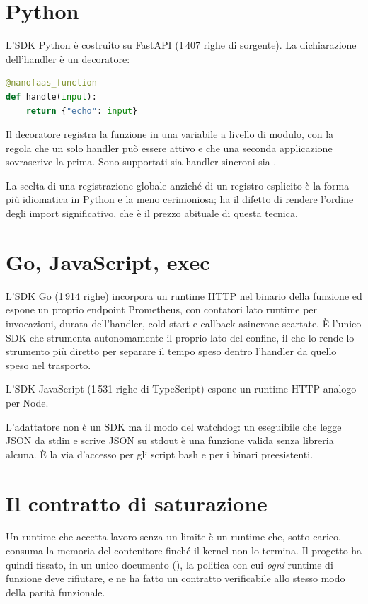 \section{Python}

L'SDK Python \`e costruito su FastAPI (1\,407 righe di sorgente). La
dichiarazione dell'handler \`e un decoratore:

\begin{lstlisting}[language=Python]
@nanofaas_function
def handle(input):
    return {"echo": input}
\end{lstlisting}

Il decoratore registra la funzione in una variabile a livello di modulo, con la
regola che un solo handler pu\`o essere attivo e che una seconda applicazione
sovrascrive la prima. Sono supportati sia handler sincroni sia .

La scelta di una registrazione globale anzich\'e di un registro esplicito \`e la
forma pi\`u idiomatica in Python e la meno cerimoniosa; ha il difetto di rendere
l'ordine degli import significativo, che \`e il prezzo abituale di questa
tecnica.

\section{Go, JavaScript, exec}

L'SDK Go (1\,914 righe) incorpora un runtime HTTP nel binario della
funzione ed espone un proprio endpoint  Prometheus, con contatori
lato runtime per invocazioni, durata dell'handler, cold start e callback
asincrone scartate. \`E l'unico SDK che strumenta autonomamente il proprio lato
del confine, il che lo rende lo strumento pi\`u diretto per separare il tempo
speso dentro l'handler da quello speso nel trasporto.

L'SDK JavaScript (1\,531 righe di TypeScript) espone un runtime HTTP analogo per Node.

L'adattatore  non \`e un SDK ma il modo  del watchdog: un
eseguibile che legge JSON da stdin e scrive JSON su stdout \`e una funzione
valida senza libreria alcuna. \`E la via d'accesso per gli script bash e per i
binari preesistenti.

\section{Il contratto di saturazione}
\label{sec:18-saturazione}

Un runtime che accetta lavoro senza un limite \`e un runtime che, sotto carico,
consuma la memoria del contenitore finch\'e il kernel non lo termina. Il progetto
ha quindi fissato, in un unico documento (),
la politica con cui \emph{ogni} runtime di funzione deve rifiutare, e ne ha
fatto un contratto verificabile allo stesso modo della parit\`a funzionale.

